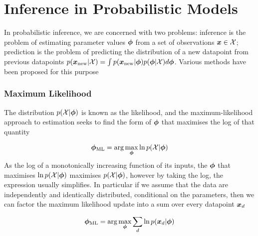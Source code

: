 

\newcommand \zd   { { \vv{z}_d } }
\newcommand \qfam { { \mathcal{Q} } }
\newcommand \xdat { { \mathcal{X} } }
\newcommand \zdat { { \mathcal{Z} } }
\newcommand \xnew { { \vv{x}_{\text{new}} } }
\newcommand \znew { { \vv{z}_{\text{new}} } }
\newcommand \param { { \vv{\phi} } }
\newcommand \ml[1] { { {#1}_{\text{ML}} } } 
\newcommand \map[1] { { {#1}_{\text{MAP}} } } 
\newcommand \quarter { { \oneover{4} } }
\newcommand \eighth { { \oneover{8} } }
\newcommand \fqt[1] { { \mathcal{F}\left( {#1} \right) } }
\newcommand \joint { { p(\xdat, \zdat | \param) } }
\newcommand \logjoint { { \ln \joint } }
\newcommand \exlogjoint[1] { { \ex{\logjoint}{{#1}} } }

\section{Inference in Probabilistic Models}
In probabilistic inference, we are concerned with two problems: inference is the problem of estimating parameter values $\param$ from a set of observations $\vv{x} \in \xdat$; prediction is the problem of predicting the distribution of a new datapoint from previous datapoints $p(\xnew | \xdat) = \int p(\xnew | \param) p(\param | \xdat) d\param$. Various methods have been proposed for this purpose

\subsubsection*{Maximum Likelihood}
The distribution $p(\xdat|\param)$ is known as the likelihood, and the maximum-likelihood approach to estimation seeks to find the form of $\param$ that maximises the log of that quantity

\begin{align*}
\ml{\param} = \arg \max_{\param} \ln p(\xdat | \param)
\end{align*}
As the log of a monotonically increasing function of its inputs, the $\param$ that maximises $\ln p(\xdat | \param)$ maximises $p(\xdat | \param)$, however by taking the log, the expression usually simplifies. In particular if we assume that the data are independently and identically distributed, conditional on the parameters, then we can factor the maximum likelihood update into a sum over every datapoint ${ \bm x_d }$

\begin{align*}
\ml{\param} = \arg \max_{\param} \sum_d \ln p(\xd | \param)
\end{align*}

